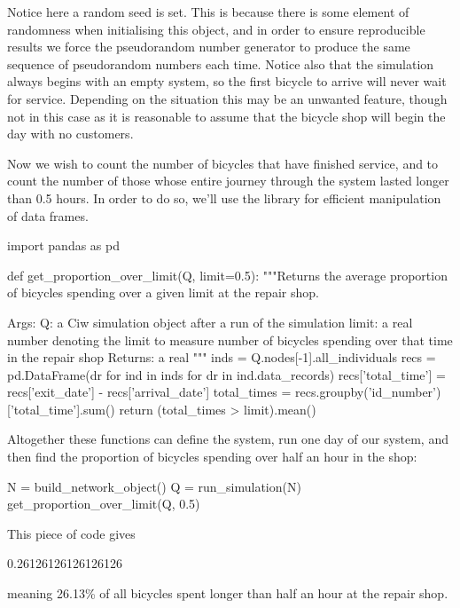 Notice here a random seed is set. This is because there is some element of
randomness when initialising this object, and in order to ensure reproducible
results we force the pseudorandom number generator to produce the same sequence
of pseudorandom numbers each time.
Notice also that the simulation always begins with an empty system, so the first
bicycle to arrive will never wait for service. Depending on the situation this
may be an unwanted feature, though not in this case as it is reasonable to
assume that the bicycle shop will begin the day with no customers.

Now we wish to count the number of bicycles that have finished service, and to
count the number of those whose entire journey through the system lasted longer
than 0.5 hours. In order to do so, we'll use the  library for
efficient manipulation of data frames.

\begin{pyin}
import pandas as pd

def get_proportion_over_limit(Q, limit=0.5):
    """Returns the average proportion of bicycles spending over
    a given limit at the repair shop.
    
    Args:
        Q: a Ciw simulation object after a run of the simulation
        limit: a real number denoting the limit to measure number
               of bicycles spending over that time in the
               repair shop    
    Returns:
        a real
    """
    inds = Q.nodes[-1].all_individuals
    recs = pd.DataFrame(dr for ind in inds for dr in ind.data_records)
    recs['total_time'] = recs['exit_date'] - recs['arrival_date']
    total_times = recs.groupby('id_number')['total_time'].sum()
    return (total_times > limit).mean()
\end{pyin}

Altogether these functions can define the system, run one day of our system, and
then find the proportion of bicycles spending over half an hour in the shop:

\begin{pyin}
N = build_network_object()
Q = run_simulation(N)
get_proportion_over_limit(Q, 0.5)
\end{pyin}

This piece of code gives

\begin{pyout}
0.26126126126126126
\end{pyout}

meaning 26.13\% of all bicycles spent longer than half an hour at the repair
shop.

